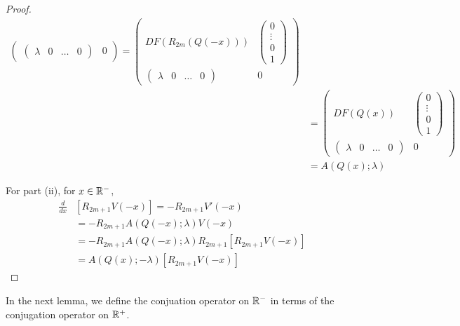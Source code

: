 \documentclass[thesis.tex]{subfiles}
\begin{document}
\begin{lemma}
\begin{proof}
\begin{align*}
\begin{pmatrix}
\begin{pmatrix} \lambda & 0 & \dots & 0 \end{pmatrix} & 0
\end{pmatrix} 
= \begin{pmatrix}
DF(R_{2m}(Q(-x))) & \begin{pmatrix} 0 \\ \vdots \\ 0 \\ 1 \end{pmatrix} \\
\begin{pmatrix} \lambda & 0 & \dots & 0 \end{pmatrix} & 0
\end{pmatrix} \\
&= \begin{pmatrix}
DF(Q(x)) & \begin{pmatrix} 0 \\ \vdots \\ 0 \\ 1 \end{pmatrix} \\
\begin{pmatrix} \lambda & 0 & \dots & 0 \end{pmatrix} & 0
\end{pmatrix} \\ 
&= A(Q(x); \lambda)
\end{align*}

For part (ii), for $x \in \mathbb{R}^-$,
\begin{align*}
\frac{d}{dx} &\left[ R_{2m+1} V(-x) \right] = -R_{2m+1} V'(-x) \\
&= -R_{2m+1} A(Q(-x); \lambda) V(-x) \\
&= -R_{2m+1} A(Q(-x); \lambda) R_{2m+1} [ R_{2m+1} V(-x)] \\
&= A(Q(x); -\lambda) [R_{2m+1} V(-x)]
\end{align*}
\end{proof}
\end{lemma}

In the next lemma, we define the conjuation operator on $\mathbb{R}^-$ in terms of the conjugation operator on $\mathbb{R}^+$.
\end{document}
